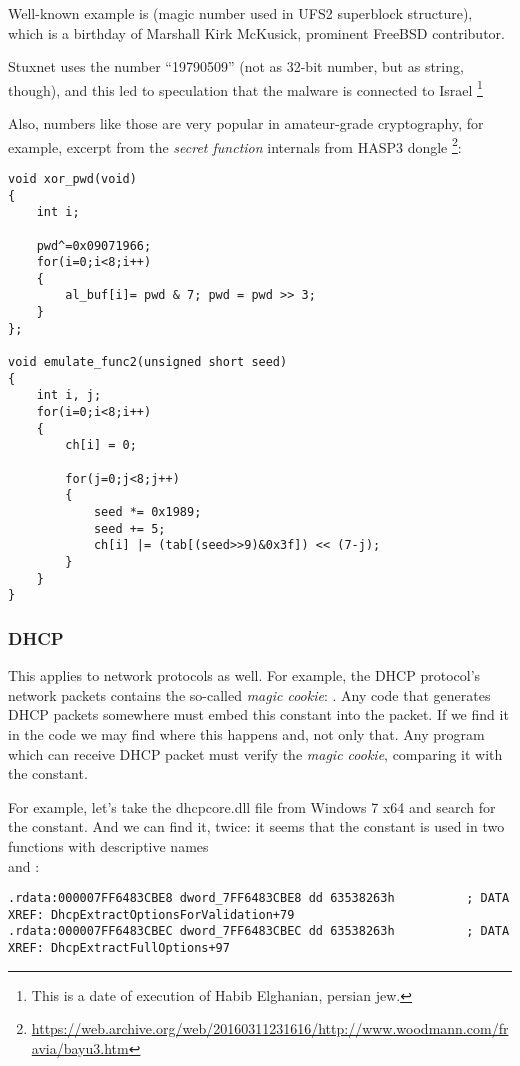 Well-known example is  (magic number used in UFS2 superblock structure), which is a birthday of Marshall Kirk McKusick, prominent FreeBSD contributor.

Stuxnet uses the number ``19790509'' (not as 32-bit number, but as string, though), and this led to speculation
that the malware is connected to Israel
\footnote{This is a date of execution of Habib Elghanian, persian jew.}

Also, numbers like those are very popular in amateur-grade cryptography, for example, excerpt from the \emph{secret function} internals from HASP3 dongle
\footnote{\url{https://web.archive.org/web/20160311231616/http://www.woodmann.com/fravia/bayu3.htm}}:

\begin{lstlisting}[style=customc]
void xor_pwd(void) 
{ 
	int i; 
	
	pwd^=0x09071966;
	for(i=0;i<8;i++) 
	{ 
		al_buf[i]= pwd & 7; pwd = pwd >> 3; 
	} 
};

void emulate_func2(unsigned short seed)
{ 
	int i, j; 
	for(i=0;i<8;i++) 
	{ 
		ch[i] = 0; 
		
		for(j=0;j<8;j++)
		{ 
			seed *= 0x1989; 
			seed += 5; 
			ch[i] |= (tab[(seed>>9)&0x3f]) << (7-j); 
		}
	} 
}
\end{lstlisting}

\subsubsection{DHCP}

This applies to network protocols as well.
For example, the DHCP protocol's network packets contains the so-called \emph{magic cookie}: .
Any code that generates DHCP packets somewhere must embed this constant into the packet.
If we find it in the code we may find where this happens and, not only that.
Any program which can receive DHCP packet must verify the \emph{magic cookie}, comparing it with the constant.

For example, let's take the dhcpcore.dll file from Windows 7 x64 and search for the constant.
And we can find it, twice:
it seems that the constant is used in two functions with descriptive names\\
 and :

\begin{lstlisting}[caption=dhcpcore.dll (Windows 7 x64),style=customasmx86]
.rdata:000007FF6483CBE8 dword_7FF6483CBE8 dd 63538263h          ; DATA XREF: DhcpExtractOptionsForValidation+79
.rdata:000007FF6483CBEC dword_7FF6483CBEC dd 63538263h          ; DATA XREF: DhcpExtractFullOptions+97
\end{lstlisting}

